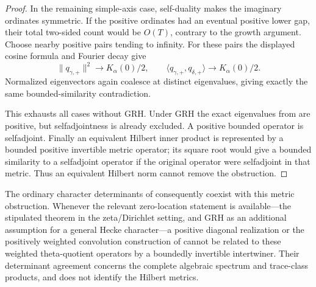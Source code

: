 \begin{proof}
In the remaining simple-axis case, self-duality makes the imaginary ordinates symmetric. If the positive ordinates had an eventual positive lower gap, their total two-sided count would be $O(T)$, contrary to the growth argument. Choose nearby positive pairs tending to infinity. For these pairs the displayed cosine formula and Fourier decay give
\[
 \|q_{\gamma,+}\|^2\longrightarrow K_\alpha(0)/2,\qquad
 \langle q_{\gamma,+},q_{\delta,+}\rangle\longrightarrow K_\alpha(0)/2.
\]
Normalized eigenvectors again coalesce at distinct eigenvalues, giving exactly the same bounded-similarity contradiction.

This exhausts all cases without GRH. Under GRH the exact eigenvalues from  are positive, but selfadjointness is already excluded. A positive bounded operator is selfadjoint. Finally an equivalent Hilbert inner product is represented by a bounded positive invertible metric operator; its square root would give a bounded similarity to a selfadjoint operator if the original operator were selfadjoint in that metric. Thus an equivalent Hilbert norm cannot remove the obstruction.
\end{proof}

The ordinary character determinants of  consequently coexist with this metric obstruction. Whenever the relevant zero-location statement is available---the stipulated theorem in the zeta/Dirichlet setting, and GRH as an additional assumption for a general Hecke character---a positive diagonal realization or the positively weighted convolution construction of  cannot be related to these weighted theta-quotient operators by a boundedly invertible intertwiner. Their determinant agreement concerns the complete algebraic spectrum and trace-class products, and does not identify the Hilbert metrics.
